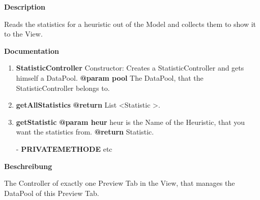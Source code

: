 \textbf{Description}

Reads the statistics for a heuristic out of the Model and collects them to show it to the View.

\textbf{Documentation}
\begin{enumerate}[+]
	\item{
	\textbf{StatisticController} \newline
	Constructor: Creates a StatisticController and gets himself a DataPool.
	\textbf{@param pool} The DataPool, that the StatisticController belongs to. \newline
}
	\item{
	\textbf{getAllStatistics} \newline
	\textbf{@return} List <Statistic >. \newline
}
	\item{
	\textbf{getStatistic} \newline
	\textbf{@param heur} heur is the Name of the Heuristic, that you want the statistics from. \newline
	\textbf{@return} Statistic. \newline
}
	\item[-]{
		\textbf{PRIVATEMETHODE} etc
	}
\end{enumerate}


\textbf{Beschreibung}

The Controller of exactly one Preview Tab in the View, that manages the DataPool of this Preview Tab.

